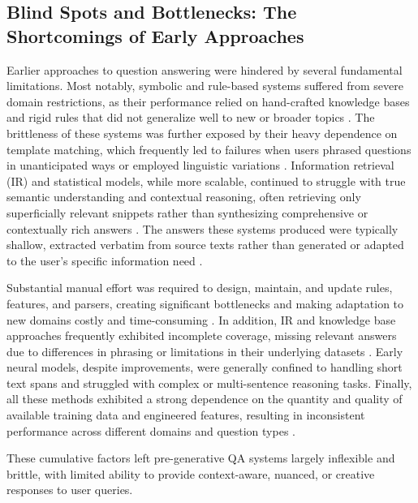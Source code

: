 \begin{spacing}{1.5}
\section{Blind Spots and Bottlenecks: The Shortcomings of Early Approaches}
Earlier approaches to question answering were hindered by several fundamental limitations. Most notably, symbolic and rule-based systems suffered from severe domain restrictions, as their performance relied on hand-crafted knowledge bases and rigid rules that did not generalize well to new or broader topics \citep{alqifari_question_2019}. The brittleness of these systems was further exposed by their heavy dependence on template matching, which frequently led to failures when users phrased questions in unanticipated ways or employed linguistic variations \citep{hirschman_natural_2001}. Information retrieval (IR) and statistical models, while more scalable, continued to struggle with true semantic understanding and contextual reasoning, often retrieving only superficially relevant snippets rather than synthesizing comprehensive or contextually rich answers \citep{alanazi_question_2021, diefenbach_core_2018}. The answers these systems produced were typically shallow, extracted verbatim from source texts rather than generated or adapted to the user’s specific information need \citep{hirschman_natural_2001,alqifari_question_2019}.

Substantial manual effort was required to design, maintain, and update rules, features, and parsers, creating significant bottlenecks and making adaptation to new domains costly and time-consuming \citep{alanazi_question_2021}. In addition, IR and knowledge base approaches frequently exhibited incomplete coverage, missing relevant answers due to differences in phrasing or limitations in their underlying datasets \citep{diefenbach_core_2018}. Early neural models, despite improvements, were generally confined to handling short text spans and struggled with complex or multi-sentence reasoning tasks. Finally, all these methods exhibited a strong dependence on the quantity and quality of available training data and engineered features, resulting in inconsistent performance across different domains and question types \citep{liu_challenges_2022,alanazi_question_2021,alqifari_question_2019,diefenbach_core_2018,hirschman_natural_2001}.

These cumulative factors left pre-generative QA systems largely inflexible and brittle, with limited ability to provide context-aware, nuanced, or creative responses to user queries.


\end{spacing}
